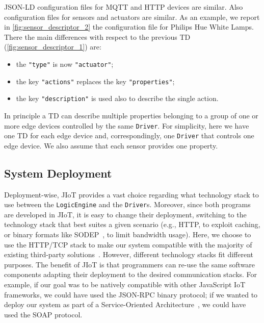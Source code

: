JSON-LD configuration files for MQTT and HTTP devices are similar. Also
configuration files for sensors and actuators are similar. As an example, we
report in \cref{fig:sensor_descriptor_2} the configuration file for Philips Hue
White Lamps. There the main differences with respect to the previous TD (\cref{fig:sensor_descriptor_1}) are:
%
\begin{itemize}
  
  \item the \lstinline{"type"} is now
  {\small\color{color:comment}\texttt{"actuator"}};

  \item the key \lstinline{"actions"} replaces the key
  \lstinline{"properties"};

  \item the key \lstinline{"description"} is used also to describe the single
  action.

\end{itemize}
%
In principle a TD can describe multiple properties belonging to a group of one
or more edge devices controlled by the same \texttt{Driver}. For simplicity,
here we have one TD for each edge device and, correspondingly, one
\texttt{Driver} that controls one edge device. We also assume that each sensor
provides one property.

\subsection{System Deployment}

Deployment-wise, JIoT provides a vast choice regarding what technology stack to
use between the \texttt{LogicEngine} and the \texttt{Driver}s.
%
Moreover, since both programs are developed in JIoT, it is easy to change
their deployment, switching to the technology stack that best suites a given
scenario (e.g., HTTP, to exploit caching, or binary formats like
SODEP~\cite{MontesiGZ14}, to limit bandwidth usage). Here, we choose to use
the HTTP/TCP stack to make our system compatible with the majority of existing
third-party solutions~\cite{richardson2008restful}. However, different
technology stacks fit different purposes. The benefit of JIoT is that
programmers can re-use the same software components adapting their deployment
to the desired communication stacks. For example, if our goal was to be
natively compatible with other JavaScript IoT frameworks, we could have used
the JSON-RPC binary protocol; if we wanted to deploy our system as part of a
Service-Oriented Architecture~\cite{Erl07}, we could have used the SOAP
protocol.

